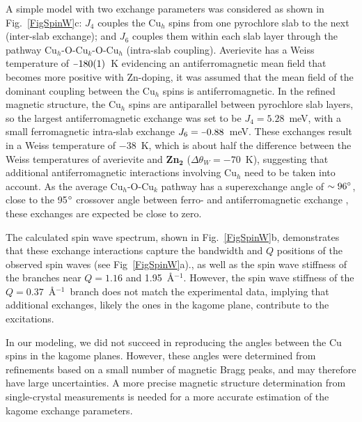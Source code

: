 \documentclass[
sn-nature,
Numbered,
iicol]
{sn-jnl}%
\newcommand{\Ang}{\AA$^{-1}$}
\newcommand{\minus}{\scalebox{0.75}[1.0]{$-$}}
\begin{document}
A simple model with two exchange parameters was considered as shown in Fig.~\ref{FigSpinW}c: $J_4$ couples the Cu$_h$ spins from one pyrochlore slab to the next (inter-slab exchange); and $J_6$ couples them within each slab layer through the pathway Cu$_h$-O-Cu$_k$-O-Cu$_h$ (intra-slab coupling). 
Averievite has a Weiss temperature of $\minus 180(1)$~K evidencing an antiferromagnetic mean field that becomes more positive with Zn-doping, it was assumed that the mean field of the dominant coupling between the Cu$_h$ spins is antiferromagnetic. 
In the refined magnetic structure, the Cu$_h$ spins are antiparallel between pyrochlore slab layers, so the largest antiferromagnetic exchange was set to be $J_4=5.28$~meV, with a small ferromagnetic intra-slab exchange $J_6=\minus0.88$~meV. 
These exchanges result in a Weiss temperature of $-38$~K, which is about half the difference between the Weiss temperatures of averievite and {\bf Zn$\mathbf {_2}$} ($\Delta\theta_W=-70$~K), suggesting that additional antiferromagnetic interactions involving Cu$_h$ need to be taken into account.
As the average Cu$_h$-O-Cu$_k$ pathway has a superexchange angle of $\sim 96\degree$, close to the 95$\degree$ crossover angle between ferro- and antiferromagnetic exchange \cite{Goodenough1955Theory/math,Kanamori1959SuperexchangeOrbitals}, these exchanges are expected be close to zero.

The calculated spin wave spectrum, shown in Fig.~\ref{FigSpinW}b, demonstrates that these exchange interactions capture the bandwidth and $Q$ positions of the observed spin waves (see Fig~\ref{FigSpinW}a)., as well as the spin wave stiffness of the branches near $Q=1.16$ and 1.95~\Ang. 
However, the spin wave stiffness of the $Q=0.37$~\Ang\ branch does not match the experimental data, implying that additional exchanges, likely the ones in the kagome plane, contribute to the excitations. 

In our modeling, we did not succeed in reproducing the angles between the Cu spins in the kagome planes. However, these angles were determined from refinements based on a small number of magnetic Bragg peaks, and may therefore have large uncertainties. A more precise magnetic structure determination from single-crystal measurements is needed for a more accurate estimation of the kagome exchange parameters.
\end{document}

